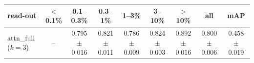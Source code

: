 \begin{tabular}{lcccccccc}
\toprule
read-out & $<$0.1\% & 0.1--0.3\% & 0.3--1\% & 1--3\% & 3--10\% & $>$10\% & all & mAP \\
\midrule
attn\_full ($k=3$) & -- & 0.795 $\pm$ 0.016 & 0.821 $\pm$ 0.011 & 0.786 $\pm$ 0.009 & 0.824 $\pm$ 0.003 & 0.892 $\pm$ 0.016 & 0.800 $\pm$ 0.006 & 0.458 $\pm$ 0.019 \\
\bottomrule
\end{tabular}
